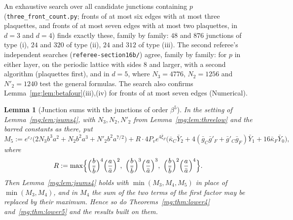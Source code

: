 \documentclass[11pt,a4paper]{article}
\newtheorem{lemma}[theorem]{Lemma}
\theoremstyle{definition}
\theoremstyle{remark}
\begin{document}
An exhaustive search over all candidate junctions containing $p$ (\texttt{three\_front\_count.py}; fronts of at most six edges with at most three plaquettes, and fronts of at most seven edges
with at most two plaquettes, in $d=3$ and $d=4$) finds exactly these, family by family: $48$ and $876$ junctions of type (i), $24$ and $320$ of type (ii), $24$ and $312$ of
type (iii). The second referee's independent searches (\texttt{referee-section16b/}) agree, family by family: for $p$ in either layer, on the periodic lattice
with sides $8$ and larger, with a second algorithm (plaquettes first), and in $d=5$, where $N_3=4776$, $N_2=1256$ and $N'_2=1240$ test the general formulas. The search also confirms
Lemma~\ref{mg:lem:betafour}(iii),(iv) for fronts of at most seven edges (Numerical).

\begin{lemma}[Junction sums with the junctions of order $\beta^5$]\label{mg:lem:jsums5}
In the setting of Lemma~\ref{mg:lem:jsums4}, with $N_3,N_2,N'_2$ from Lemma~\ref{mg:lem:threelow} and the barred constants as there, put
\[
M_5:=e^{c_J}\bigl(2N_3b^3a^2+N_2b^2a^3+N'_2b^2a^{7/2}\bigr)+R\cdot4P_ve^{4\bar\xi_F}\bigl(\bar\kappa_C\bar Y_2+4(\bar g_C\bar g'_F+\bar g'_C\bar g_F)\bar Y_1+16\bar\kappa_F\bar Y_0\bigr),
\]
where
\[
R:=\max\Bigl\{\Bigl(\frac b{\bar b}\Bigr)^4\Bigl(\frac a{\bar a}\Bigr)^2,\ \Bigl(\frac b{\bar b}\Bigr)^3\Bigl(\frac a{\bar a}\Bigr)^3,\ \Bigl(\frac b{\bar b}\Bigr)^2\Bigl(\frac a{\bar a}\Bigr)^4\Bigr\} .
\]
Then Lemma~\ref{mg:lem:jsums4} holds with $\min(M_3,M_4,M_5)$ in place of $\min(M_3,M_4)$, and in $M_4$ the sum of the two terms of the first factor may be replaced by their
maximum. Hence so do Theorems~\ref{mg:thm:lower4} and~\ref{mg:thm:lower5} and the
results built on them.
\end{lemma}
\end{document}
